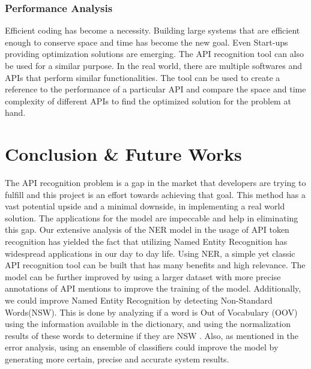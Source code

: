 \documentclass{sig-alternate-05-2015}
\begin{document}
\subsubsection{Performance Analysis}
Efficient coding has become a necessity. Building large systems that are efficient enough to conserve space and time has become the new goal. Even Start-ups providing optimization solutions are emerging. The API recognition tool can also be used for a similar purpose. In the real world, there are multiple softwares and APIs that perform similar functionalities. The tool can be used to create a reference to the performance of a particular API and compare the space and time complexity of different APIs to find the optimized solution for the problem at hand. 

\section{Conclusion \& Future Works}
The API recognition problem is a gap in the market that developers are trying to fulfill and this project is an effort towards achieving that goal. This method has a vast potential upside and a minimal downside, in implementing a real world solution. The applications for the model are impeccable and help in eliminating this gap. Our extensive analysis of the NER model in the usage of API token recognition has yielded the fact that utilizing Named Entity Recognition has widespread applications in our day to day life. Using NER, a simple yet classic API recognition tool can be built that has many benefits and high relevance. The model can be further improved by using a larger dataset with more precise annotations of API mentions to improve the training of the model. Additionally, we could improve Named Entity Recognition by detecting Non-Standard Words(NSW). This is done by analyzing if a word is Out of Vocabulary (OOV) using the information available in the dictionary, and using the normalization results of these words to determine if they are NSW \cite{liimproving}. Also, as mentioned in the error analysis, using an ensemble of classifiers could improve the model by generating more certain, precise and accurate system results.


\end{document}

